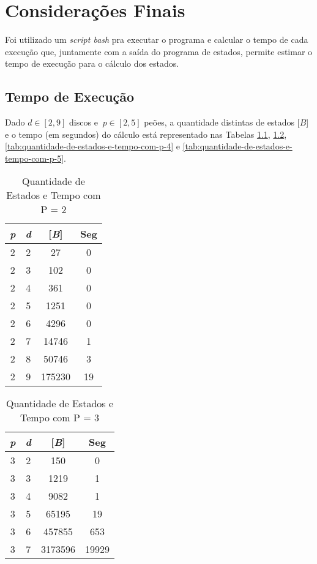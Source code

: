 \chapter[Considerações Finais]{Considerações Finais}
\label{cha:resultados-parciais}

Foi utilizado um \emph{script bash} pra executar o programa e calcular o tempo de cada execução que, juntamente com a saída do programa de estados, permite estimar o tempo de execução para o cálculo dos estados.

\section{Tempo de Execução}

Dado $d\!\in\![2,9]$ discos e $\ p\!\in\![2,5]$ peões, a quantidade distintas de estados [$B$] e o tempo (em segundos) do cálculo está representado nas Tabelas \ref{tab:quantidade-de-estados-e-tempo-com-p-2}, \ref{tab:quantidade-de-estados-e-tempo-com-p-3}, \ref{tab:quantidade-de-estados-e-tempo-com-p-4} e \ref{tab:quantidade-de-estados-e-tempo-com-p-5}.

\begin{table}[ht]
\centering
\begin{tabular}{|c|c|c|c|}
\hline
\emph{p} & \emph{d} & [\emph{B}] & Seg\tabularnewline
\hline
\hline
2 & 2 & 27 & 0\tabularnewline
\hline
2 & 3 & 102 & 0\tabularnewline
\hline
2 & 4 & 361 & 0\tabularnewline
\hline
2 & 5 & 1251 & 0\tabularnewline
\hline
2 & 6 & 4296 & 0\tabularnewline
\hline
2 & 7 & 14746 & 1\tabularnewline
\hline
2 & 8 & 50746 & 3\tabularnewline
\hline
2 & 9 & 175230 & 19\tabularnewline
\hline
\end{tabular}
\caption{Quantidade de Estados e Tempo com P = 2}
\label{tab:quantidade-de-estados-e-tempo-com-p-2}
\end{table}

\begin{table}[ht]
\centering
\begin{tabular}{|c|c|c|c|}
\hline
\emph{p} & \emph{d} & [\emph{B}] & Seg\tabularnewline
\hline
\hline
3 & 2 & 150 & 0\tabularnewline
\hline
3 & 3 & 1219 & 1\tabularnewline
\hline
3 & 4 & 9082 & 1\tabularnewline
\hline
3 & 5 & 65195 & 19\tabularnewline
\hline
3 & 6 & 457855 & 653\tabularnewline
\hline
3 & 7 & 3173596 & 19929\tabularnewline
\hline
\end{tabular}
\caption{Quantidade de Estados e Tempo com P = 3}
\label{tab:quantidade-de-estados-e-tempo-com-p-3}
\end{table}

